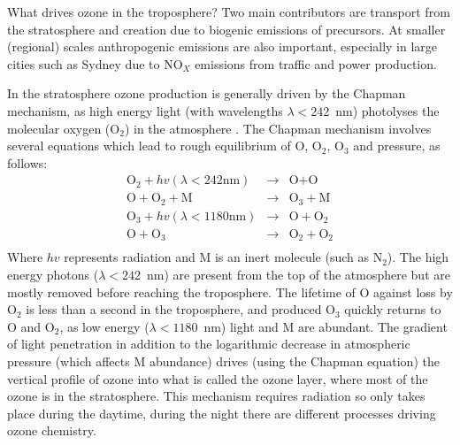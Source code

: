     What drives ozone in the troposphere? Two main contributors are transport from the stratosphere and creation due to biogenic emissions of precursors. 
    At smaller (regional) scales anthropogenic emissions are also important, especially in large cities such as Sydney due to NO$_X$ emissions from traffic and power production.
    
    In the stratosphere ozone production is generally driven by the Chapman mechanism, as high energy light (with wavelengths $\lambda<242$~nm) photolyses the molecular oxygen (O$_2$) in the atmosphere \citep[][Chapter 3, section 2]{BrasseurJacob2017}.
    The Chapman mechanism involves several equations which lead to rough equilibrium of O, O$_2$, O$_3$ and pressure, as follows:
    \begin{eqnarray*}
    	\label{LF:eqn:Chapman}
    	\textrm{O}_2 + hv(\lambda < 242 \text{nm}) & \rightarrow & \text{O} + \text{O} \\
    	\text{O} + \text{O}_2 + \text{M} & \rightarrow & \text{O}_3 + \text{M} \\
    	\text{O}_3 + hv(\lambda < 1180 \text{nm}) & \rightarrow & \text{O} + \text{O}_2 \\
    	\text{O} + \text{O}_3 & \rightarrow & \text{O}_2 + \text{O}_2 \\
    \end{eqnarray*}
    Where $hv$ represents radiation and M is an inert molecule (such as N$_2$).
    The high energy photons ($\lambda < 242$~nm) are present from the top of the atmosphere but are mostly removed before reaching the troposphere.
    The lifetime of O against loss by O$_2$ is less than a second in the troposphere, and produced O$_3$ quickly returns to O and O$_2$, as low energy ($\lambda < 1180$~nm) light and M are abundant.
    The gradient of light penetration in addition to the logarithmic decrease in atmospheric pressure (which affects M abundance) drives (using the Chapman equation) the vertical profile of ozone into what is called the ozone layer, where most of the ozone is in the stratosphere.
    This mechanism requires radiation so only takes place during the daytime, during the night there are different processes driving ozone chemistry.
    
